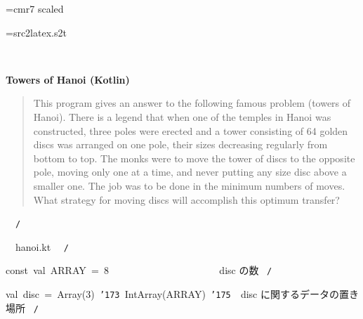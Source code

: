 \documentclass{article}
\begin{document}
\ifx\sevenrm\undefined
  \font\sevenrm=cmr7 scaled 
\fi

\newread\MyStyle
\openin\MyStyle=src2latex.s2t
\ifeof\MyStyle
  \closein\MyStyle
\else
  
  \closein\MyStyle
\fi

\def\mc{\relax}
\def\gt{\relax}
\def\sc{\scshape}

\tt\mc 

\noindent
\rm\mc {\tt /}{\tt *}\  \hrulefill \rm\mc \ {\tt *}

\noindent
\mbox{}\hfill

\noindent
\mbox{}\hfill

\noindent
\mbox{} {}%

\centerline{\bf Towers of Hanoi (Kotlin)}

\begin{quote}

This program gives an answer to the following famous problem (towers of
Hanoi).
There is a legend that when one of the temples in Hanoi was constructed,
three poles were erected and a tower consisting of 64 golden discs was
arranged on one pole, their sizes decreasing regularly from bottom to top.
The monks were to move the tower of discs to the opposite pole, moving
only one at a time, and never putting any size disc above a smaller one.
The job was to be done in the minimum numbers of moves. What strategy for
moving discs will accomplish this optimum transfer?
\end{quote}


\noindent
\mbox{}\hfill

\noindent
\mbox{}{\tt *}\  \hrulefill \rm\mc \ {\tt *}{\tt /}
\tt\mc 

\noindent
\mbox{}\hfill

\noindent
\mbox{}\hfill

\noindent
\mbox{}\rm\mc {\tt /}{\tt *}\  \hrulefill\ hanoi.kt \ \hrulefill \rm\mc \ {\tt *}{\tt /}
\tt\mc 

\noindent
\mbox{}\hfill

\noindent
\mbox{}\hfill

\noindent
\mbox{}const{\tt\mc \ }val{\tt\mc \ }ARRAY{\tt\mc \ }={\tt\mc \ }8{\tt\mc \ \ \ \ \ }{\tt\mc \ \ \ \ \ \ \ \ }{\tt\mc \ \ \ \ \ \ \ \ }\rm\mc {\tt /}{\tt *}\  {}disc の数 \hfill \rm\mc \ {\tt *}{\tt /}
\tt\mc 

\noindent
\mbox{}\hfill

\noindent
\mbox{}val{\tt\mc \ }disc{\tt\mc \ }={\tt\mc \ }Array(3){\tt\mc \ }{\tt\char'173}{\tt\mc \ }IntArray(ARRAY){\tt\mc \ }{\tt\char'175}{\tt\mc \ }\rm\mc {\tt /}{\tt *}\  {}disc に関するデータの置き場所
					   \hfill \rm\mc \ {\tt *}{\tt /}
\tt\mc 
\end{document}
